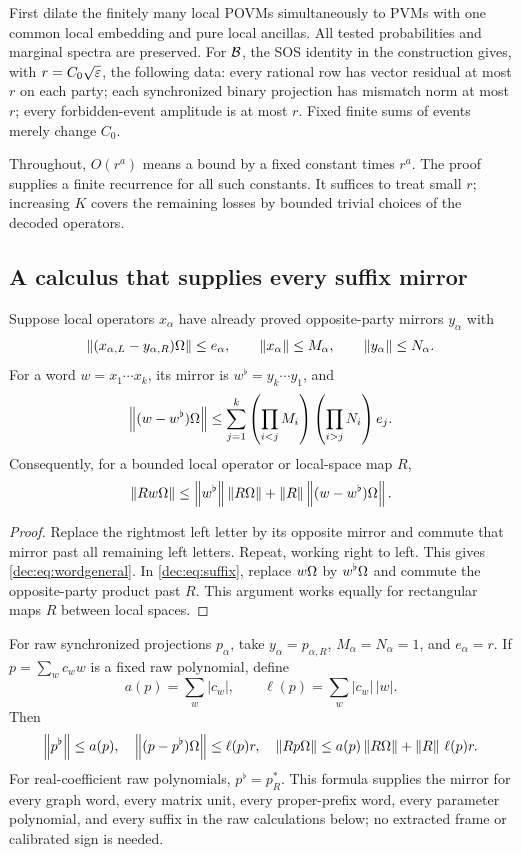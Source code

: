 First dilate the finitely many local POVMs simultaneously to PVMs with one common local embedding and pure local ancillas. All tested probabilities and marginal spectra are preserved. For $\mathcal B$, the SOS identity in the construction gives, with $r=C_0\sqrt{\varepsilon}$, the following data: every rational row has vector residual at most $r$ on each party; each synchronized binary projection has mismatch norm at most $r$; every forbidden-event amplitude is at most $r$. Fixed finite sums of events merely change $C_0$.

Throughout, $O(r^a)$ means a bound by a fixed constant times $r^a$. The proof supplies a finite recurrence for all such constants. It suffices to treat small $r$; increasing $K$ covers the remaining losses by bounded trivial choices of the decoded operators.

\subsection{A calculus that supplies every suffix mirror}\label{dec:sec:calculus}
\begin{lemma}\label{dec:lem:word}
Suppose local operators $x_\alpha$ have already proved opposite-party mirrors $y_\alpha$ with
\[
\left\lVert(x_{\alpha,L}-y_{\alpha,R})\Omega\right\rVert\le e_\alpha,
\qquad \left\lVert x_\alpha\right\rVert\le M_\alpha,
\qquad\left\lVert y_\alpha\right\rVert\le N_\alpha.
\]
For a word $w=x_1\cdots x_k$, its mirror is $w^\flat=y_k\cdots y_1$, and
\begin{equation}\label{dec:eq:wordgeneral}
\left\lVert(w-w^\flat)\Omega\right\rVert
\le \sum_{j=1}^k\left(\prod_{i<j}M_i\right)
\left(\prod_{i>j}N_i\right)e_j.
\end{equation}
Consequently, for a bounded local operator or local-space map $R$,
\begin{equation}\label{dec:eq:suffix}
\left\lVert Rw\Omega\right\rVert\le\left\lVert w^\flat\right\rVert\left\lVert R\Omega\right\rVert
+\left\lVert R\right\rVert\left\lVert(w-w^\flat)\Omega\right\rVert.
\end{equation}
\end{lemma}
\begin{proof}
Replace the rightmost left letter by its opposite mirror and commute that mirror past all remaining left letters. Repeat, working right to left. This gives \eqref{dec:eq:wordgeneral}. In \eqref{dec:eq:suffix}, replace $w\Omega$ by $w^\flat\Omega$ and commute the opposite-party product past $R$. This argument works equally for rectangular maps $R$ between local spaces.
\end{proof}

For raw synchronized projections $p_\alpha$, take $y_\alpha=p_{\alpha,R}$, $M_\alpha=N_\alpha=1$, and $e_\alpha=r$. If $p=\sum_w c_ww$ is a fixed raw polynomial, define
\[
a(p)=\sum_w|c_w|,\qquad \ell(p)=\sum_w|c_w|\,|w|.
\]
Then
\begin{equation}\label{dec:eq:rawmirror}
\left\lVert p^\flat\right\rVert\le a(p),\quad
\left\lVert(p-p^\flat)\Omega\right\rVert\le \ell(p)r,\quad
\left\lVert Rp\Omega\right\rVert\le a(p)\left\lVert R\Omega\right\rVert+\left\lVert R\right\rVert\,\ell(p)r.
\end{equation}
For real-coefficient raw polynomials, $p^\flat=p_R^*$. This formula supplies the mirror for every graph word, every matrix unit, every proper-prefix word, every parameter polynomial, and every suffix in the raw calculations below; no extracted frame or calibrated sign is needed.

